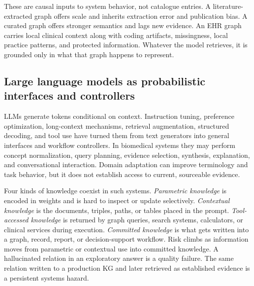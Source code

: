These are causal inputs to system behavior, not catalogue entries. A literature-extracted graph offers scale and inherits extraction error and publication bias. A curated graph offers stronger semantics and lags new evidence. An EHR graph carries local clinical context along with coding artifacts, missingness, local practice patterns, and protected information. Whatever the model retrieves, it is grounded only in what that graph happens to represent.

\subsection{Large language models as probabilistic interfaces and controllers}

LLMs generate tokens conditional on context. Instruction tuning, preference optimization, long-context mechanisms, retrieval augmentation, structured decoding, and tool use have turned them from text generators into general interfaces and workflow controllers. In biomedical systems they may perform concept normalization, query planning, evidence selection, synthesis, explanation, and conversational interaction. Domain adaptation can improve terminology and task behavior, but it does not establish access to current, sourceable evidence.


Four kinds of knowledge coexist in such systems. \emph{Parametric knowledge} is encoded in weights and is hard to inspect or update selectively. \emph{Contextual knowledge} is the documents, triples, paths, or tables placed in the prompt. \emph{Tool-accessed knowledge} is returned by graph queries, search systems, calculators, or clinical services during execution. \emph{Committed knowledge} is what gets written into a graph, record, report, or decision-support workflow. Risk climbs as information moves from parametric or contextual use into committed knowledge. A hallucinated relation in an exploratory answer is a quality failure. The same relation written to a production KG and later retrieved as established evidence is a persistent systems hazard.

